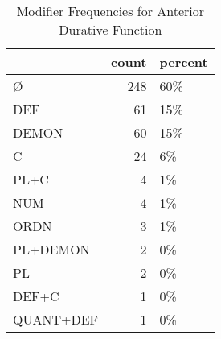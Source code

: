 \begin{table}[htbp!]
\centering
\caption{Modifier Frequencies for Anterior Durative Function}
\label{table:antdur_mod_cp}
\begin{tabular}{lrl}
\toprule
{} &  count & percent \\
\midrule
Ø         &    248 &     60\% \\
DEF       &     61 &     15\% \\
DEMON     &     60 &     15\% \\
C         &     24 &      6\% \\
PL+C      &      4 &      1\% \\
NUM       &      4 &      1\% \\
ORDN      &      3 &      1\% \\
PL+DEMON  &      2 &      0\% \\
PL        &      2 &      0\% \\
DEF+C     &      1 &      0\% \\
QUANT+DEF &      1 &      0\% \\
\bottomrule
\end{tabular}
\end{table}
